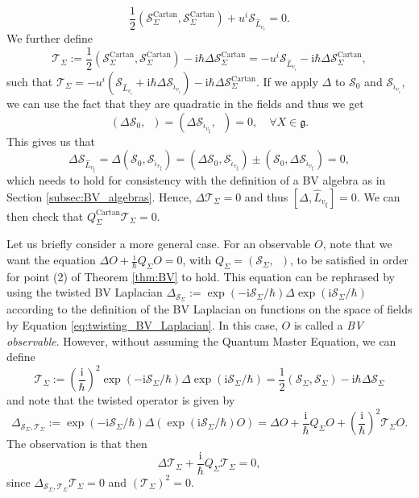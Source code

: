 \documentclass[11pt,colorinlistoftodos]{amsart}
\numberwithin{equation}{subsection}
\theoremstyle{plain}
\theoremstyle{definition}
\theoremstyle{remark}
\newcommand{\calS}{\mathcal{S}}
\newcommand{\calT}{\mathcal{T}}
\newcommand{\I}{\mathrm{i}}
\begin{document}
\begin{equation}
\label{eq:equivariant_master_equation}
\frac{1}{2}(\calS^\mathrm{Cartan}_\Sigma,\calS^\mathrm{Cartan}_\Sigma)+u^i\calS_{\hat{L}_{v_i}}=0. 
\end{equation}
We further define
\[
\calT_{\Sigma}:=\frac{1}{2}(\calS^\mathrm{Cartan}_\Sigma,\calS^\mathrm{Cartan}_\Sigma)-\I\hbar\Delta \calS^\mathrm{Cartan}_\Sigma=-u^i\calS_{\hat{L}_{v_i}}-\I\hbar \Delta \calS^\mathrm{Cartan}_\Sigma,
\]
such that $\calT_\Sigma=-u^i(\calS_{\hat{L}_{v_i}}+\I\hbar\Delta\calS_{\hat{\iota}_{v_i}})-\I\hbar\Delta\calS^\mathrm{Cartan}_\Sigma$. If we apply $\Delta$ to $\calS_0$ and $\calS_{\hat{\iota}_{v_i}}$, we can use the fact that they are quadratic in the fields and thus we get 
\begin{equation}
\label{eq:equivariant_BV_1}
(\Delta\calS_0,\enspace)=(\Delta\calS_{\hat{\iota}_{v_\xi}},\enspace)=0,\quad\forall X\in\mathfrak{g}.
\end{equation}
This gives us that 
\[
\Delta\calS_{\hat{L}_{v_\xi}}=\Delta(\calS_0,\calS_{\hat{\iota}_{v_\xi}})=(\Delta\calS_0,\calS_{\hat{\iota}_{v_\xi}})\pm (\calS_0,\Delta\calS_{\hat{\iota}_{v_\xi}})=0,
\]
which needs to hold for consistency with the definition of a BV algebra as in Section \ref{subsec:BV_algebras}. Hence, $\Delta\calT_\Sigma=0$ and thus $[\Delta,\hat{L}_{v_\xi}]=0$. We can then check that $Q^\mathrm{Cartan}_\Sigma\calT_\Sigma=0$. 

Let us briefly consider a more general case. For an observable $O$, note that we want the equation $\Delta O+\frac{\I}{\hbar}Q_\Sigma O=0$, with $Q_\Sigma=(\calS_\Sigma,\enspace)$, to be satisfied in order for point (2) of Theorem \ref{thm:BV} to hold. This equation can be rephrased by using the twisted BV Laplacian $\Delta_{\calS_\Sigma}:=\exp(-\I\calS_\Sigma/\hbar)\Delta\exp(\I\calS_\Sigma/\hbar)$ according to the definition of the BV Laplacian on functions on the space of fields by Equation \eqref{eq:twisting_BV_Laplacian}. 
In this case, $O$ is called a \emph{BV observable}. However, without assuming the Quantum Master Equation, we can define 
\[
\calT_\Sigma:=\left(\frac{\I}{\hbar}\right)^2\exp(-\I\calS_\Sigma/\hbar)\Delta \exp(\I\calS_\Sigma/\hbar)=\frac{1}{2}(\calS_\Sigma,\calS_\Sigma)-\I\hbar\Delta \calS_\Sigma
\]
and note that the twisted operator is given by 
\[
\Delta_{\calS_\Sigma,\calT_\Sigma}:=\exp(-\I\calS_\Sigma/\hbar)\Delta(\exp(\I\calS_\Sigma/\hbar)O)=\Delta O+\frac{\I}{\hbar}Q_\Sigma O+\left(\frac{\I}{\hbar}\right)^2\calT_\Sigma O.
\]
The observation is that then 
\[
\Delta\calT_\Sigma+\frac{\I}{\hbar}Q_\Sigma\calT_\Sigma=0,
\]
since $\Delta_{\calS_\Sigma,\calT_\Sigma}\calT_\Sigma=0$ and $(\calT_\Sigma)^2=0$. 
\end{document}

